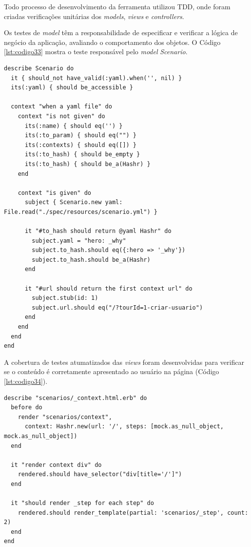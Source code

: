 Todo processo de desenvolvimento da ferramenta utilizou TDD, onde foram criadas verificações unitárias dos \textit{models}, \textit{views} e \textit{controllers}.

Os testes de \textit{model} têm a responsabilidade de especificar e verificar a lógica de negócio da aplicação, avaliando o comportamento dos objetos. O Código \ref{lst:codigo33} mostra o teste responsável pelo \textit{model} \textit{Scenario}.

{\singlespace
\begin{lstlisting}[caption=Teste unitário de \textit{model},label={lst:codigo33}]
describe Scenario do
  it { should_not have_valid(:yaml).when('', nil) }
  its(:yaml) { should be_accessible }

  context "when a yaml file" do
    context "is not given" do
      its(:name) { should eq('') }
      its(:to_param) { should eq("") }
      its(:contexts) { should eq([]) }
      its(:to_hash) { should be_empty }
      its(:to_hash) { should be_a(Hashr) }
    end

    context "is given" do
      subject { Scenario.new yaml: File.read("./spec/resources/scenario.yml") }

      it "#to_hash should return @yaml Hashr" do
        subject.yaml = "hero: _why"
        subject.to_hash.should eq({:hero => '_why'})
        subject.to_hash.should be_a(Hashr)
      end

      it "#url should return the first context url" do
        subject.stub(id: 1)
        subject.url.should eq("/?tourId=1-criar-usuario")
      end
    end
  end
end
\end{lstlisting}
}

A cobertura de testes atumatizados das \textit{views} foram desenvolvidas para verificar se o conteúdo é corretamente apresentado ao usuário na página (Código \ref{lst:codigo34}).

{\singlespace
\begin{lstlisting}[caption=Teste unitário de \textit{view},label={lst:codigo34}]
describe "scenarios/_context.html.erb" do
  before do
    render "scenarios/context",
      context: Hashr.new(url: '/', steps: [mock.as_null_object, mock.as_null_object])
  end

  it "render context div" do
    rendered.should have_selector("div[title='/']")
  end

  it "should render _step for each step" do
    rendered.should render_template(partial: 'scenarios/_step', count: 2)
  end
end
\end{lstlisting}
}

